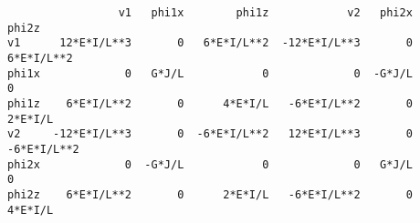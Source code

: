 \documentclass[12pt,fleqn]{article}\usepackage{../../common}
\begin{document}
\begin{verbatim}
                 v1   phi1x        phi1z            v2   phi2x        phi2z
v1      12*E*I/L**3       0   6*E*I/L**2  -12*E*I/L**3       0   6*E*I/L**2
phi1x             0   G*J/L            0             0  -G*J/L            0
phi1z    6*E*I/L**2       0      4*E*I/L   -6*E*I/L**2       0      2*E*I/L
v2     -12*E*I/L**3       0  -6*E*I/L**2   12*E*I/L**3       0  -6*E*I/L**2
phi2x             0  -G*J/L            0             0   G*J/L            0
phi2z    6*E*I/L**2       0      2*E*I/L   -6*E*I/L**2       0      4*E*I/L
\end{verbatim}
\end{document}
